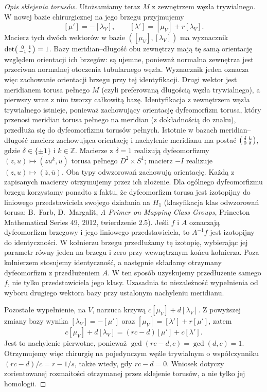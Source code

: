 \begin{proof}[Opis sklejenia torusów]
Utożsamiamy teraz $M$ z zewnętrzem węzła trywialnego.
W nowej bazie chirurgicznej na jego brzegu przyjmujemy
\[
 [\mu']=-[\lambda_V],\qquad
 [\lambda']=[\mu_V]+r[\lambda_V].
\]
Macierz tych dwóch wektorów w bazie
$([\mu_V],[\lambda_V])$ ma wyznacznik
$\det\begin{psmallmatrix}0&1\\-1&r\end{psmallmatrix}=1$.
Bazy meridian--długość obu zewnętrzy mają
tę samą orientację względem orientacji ich brzegów:
są ujemne, ponieważ normalna zewnętrza jest przeciwna
normalnej otoczenia tubularnego węzła.
Wyznacznik jeden oznacza więc zachowanie orientacji
brzegu przy tej identyfikacji.
Drugi wektor jest meridianem torusa pełnego $M$
(czyli preferowaną długością węzła trywialnego),
a pierwszy wraz z nim tworzy całkowitą bazę.
Identyfikacja z zewnętrzem węzła trywialnego
istnieje, ponieważ zachowujący orientację dyfeomorfizm
torusa, który przenosi meridian torusa pełnego na
meridian (z dokładnością do znaku), przedłuża się
do dyfeomorfizmu torusów pełnych. Istotnie w bazach meridian--długość macierz
zachowująca orientację i nachylenie meridianu
ma postać
$\begin{psmallmatrix}\delta&k\\0&\delta\end{psmallmatrix}$,
gdzie $\delta\in\{\pm1\}$ i $k\in\mathbb Z$.
Macierze z $\delta=1$ realizują dyfeomorfizmy
$(z,u)\mapsto(zu^k,u)$ torusa pełnego
$D^2\times S^1$; macierz $-I$ realizuje
$(z,u)\mapsto(\overline z,\overline u)$.
Oba typy odwzorowań zachowują orientację.
Każdą z zapisanych macierzy otrzymujemy przez
ich złożenie. Dla ogólnego dyfeomorfizmu brzegu
korzystamy ponadto z faktu, że dyfeomorfizm torusa
jest izotopijny do liniowego przedstawiciela
swojego działania na $H_1$ (klasyfikacja klas
odwzorowań torusa: B.~Farb, D.~Margalit,
\emph{A Primer on Mapping Class Groups},
Princeton Mathematical Series 49, 2012,
twierdzenie 2.5).
Jeśli $f$ i $A$ oznaczają dyfeomorfizm brzegowy
i jego liniowego przedstawiciela, to $A^{-1}f$
jest izotopijny do identyczności. W kołnierzu
brzegu przedłużamy tę izotopię, wybierając jej
parametr równy jeden na brzegu i zero przy
wewnętrznym końcu kołnierza. Poza kołnierzem
stosujemy identyczność, a następnie składamy
otrzymany dyfeomorfizm z przedłużeniem $A$.
W ten sposób uzyskujemy przedłużenie samego $f$,
nie tylko przedstawiciela jego klasy. Uzasadnia to niezależność
wypełnienia od wyboru drugiego wektora bazy
przy ustalonym nachyleniu meridianu.

Pozostałe wypełnienie, na $V$, narzuca krzywą
$c[\mu_V]+d[\lambda_V]$. Z powyższej zmiany bazy
wynika $[\lambda_V]=-[\mu']$ oraz
$[\mu_V]=[\lambda']+r[\mu']$, zatem
\[
 c[\mu_V]+d[\lambda_V]
 =(rc-d)[\mu']+c[\lambda'].
\]
Jest to nachylenie pierwotne, ponieważ
$\gcd(rc-d,c)=\gcd(d,c)=1$.
Otrzymujemy więc chirurgię na pojedynczym węźle
trywialnym o współczynniku $(rc-d)/c=r-1/s$,
także wtedy, gdy $rc-d=0$.
Wniosek dotyczy zorientowanej rozmaitości otrzymanej
przez sklejenie torusów, a nie tylko jej homologii.


\end{proof}
